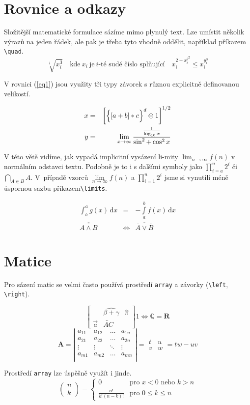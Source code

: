 \documentclass[11pt, a4paper]{article}
\theoremstyle{definition}
\begin{document}
\section{Rovnice a odkazy}

Složitější matematické formulace sázíme mimo plynulý text. Lze umístit několik výrazů na jeden řádek, ale pak je třeba tyto vhodně oddělit, například příkazem \verb|\quad|.
$$\sqrt[i]{x_i^3}\quad \text{kde}\ x_i\ \text{je}\ i\text{-té sudé číslo splňující}\quad x_i^{2-{x_i^i}^2}\leq x_i^{y_i^3}$$

V rovnici (\ref{eq1}) jsou využity tři typy závorek s různou explicitně definovanou velikostí.

\begin{eqnarray}
\label{eq1}
    x &=&{\bigg[{{\Big{\{}[a+b]*c\Big{\}}}^d}\ominus 1\bigg]}^{1/2} \\
    y&=&\lim_{x \to \infty} \frac{\frac{1}{\log_{10} x}}{\sin^2 + \cos^2 x}
    \nonumber
\end{eqnarray}

V této větě vidíme, jak vypadá implicitní vysázení li-mity $\lim_{n\to \infty} f(n)$ v normálním odstavci textu. Podobně je to i s dalšími symboly jako $\prod_{i=a}^n 2^i$ či $\bigcap_{A\in B} A$. V~případě vzorců $\lim\limits _{n \to \infty} f(n)$ a $\prod\limits _{i=1}^n 2^i$ jsme si vynutili méně úspornou sazbu příkazem\verb|\limits|.

\begin{eqnarray}
    \int_b^a g(x)\,\mathrm{d}x &=& - \int\limits_a^b f(x)\,\mathrm{d}x\\
    \overline{\overline{A\wedge B}} &\Leftrightarrow& \overline{\overline{A} \vee \overline{B}}
\end{eqnarray}

\section{Matice}

Pro sázení matic se velmi často používá prostředí \verb|array| a závorky (\verb|\left|, \verb|\right|).

$$\left[
\begin{array}{ccc}
&\widehat{\beta + \gamma} & \hat{\pi} \\
\vec{a} & \overleftrightarrow{AC} &
\end{array} 
\right] 1\Longleftrightarrow {\mathbb Q} = \mathbf{R}
$$
$$
\mathbf{A}=
\left|
\begin{array}{cccc}
a_{11}&a_{12}&\ldots&a_{1n}\\
a_{21}&a_{22}&\ldots&a_{2n}\\
\vdots&\vdots&\ddots&\vdots\\
a_{m1}&a_{m2}&\ldots&a_{mn}\\
\end{array}
\right|
=
\begin{array}{rl}
    t & u \\
    v & w
\end{array}
=tw-uv
$$

Prostředí \verb|array| lze úspěšně využít i jinde.
$$
\left(
\begin{array}{c}
n\\
k
\end{array}
\right)
=
 \left\{
 \begin{array}{ll}0 & \text{pro } x<0 \text{ nebo }k>n\\
 \frac{n!}{k!(n-k)!} & \text{pro } 0 \leq k \leq n
 \end{array}
 \right.
$$
\end{document}
